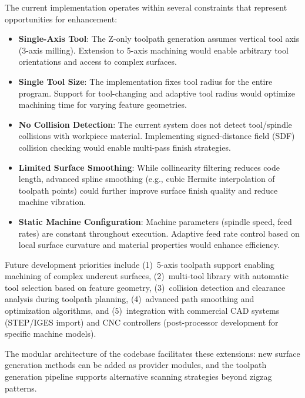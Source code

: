 \documentclass[a4paper,12pt]{article}
\begin{document}
The current implementation operates within several constraints that represent
opportunities for enhancement:

\begin{itemize}
  \item \textbf{Single-Axis Tool}: The Z-only toolpath generation assumes
    vertical tool axis (3-axis milling). Extension to 5-axis machining would
    enable arbitrary tool orientations and access to complex surfaces.

  \item \textbf{Single Tool Size}: The implementation fixes tool radius for the
    entire program. Support for tool-changing and adaptive tool radius would
    optimize machining time for varying feature geometries.

  \item \textbf{No Collision Detection}: The current system does not detect
    tool/spindle collisions with workpiece material. Implementing signed-distance
    field (SDF) collision checking would enable multi-pass finish strategies.

  \item \textbf{Limited Surface Smoothing}: While collinearity filtering reduces
    code length, advanced spline smoothing (e.g., cubic Hermite interpolation
    of toolpath points) could further improve surface finish quality and reduce
    machine vibration.

  \item \textbf{Static Machine Configuration}: Machine parameters (spindle
    speed, feed rates) are constant throughout execution. Adaptive feed rate
    control based on local surface curvature and material properties would
    enhance efficiency.
\end{itemize}

Future development priorities include (1)~5-axis toolpath support enabling
machining of complex undercut surfaces, (2)~multi-tool library with automatic
tool selection based on feature geometry, (3)~collision detection and clearance
analysis during toolpath planning, (4)~advanced path smoothing and optimization
algorithms, and (5)~integration with commercial CAD systems (STEP/IGES import)
and CNC controllers (post-processor development for specific machine models).

The modular architecture of the codebase facilitates these extensions: new
surface generation methods can be added as provider modules, and the toolpath
generation pipeline supports alternative scanning strategies beyond zigzag
patterns.
\end{document}
